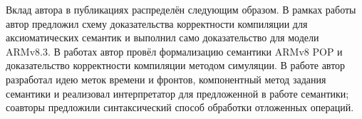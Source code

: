 {\begin{refsection}
        Вклад автора в публикациях распределён следующим образом.
        В рамках работы \cite{Podkopaev-al:NTV17,Podkopaev-al:ISPRAS17} автор предложил схему доказательства корректности компиляции
        для аксиоматических семантик и выполнил само доказательство для модели ARMv8.3.
        В работах \cite{Podkopaev-al:ECOOP17, Podkopaev-al:PLC17}
        автор провёл формализацию семантики ARMv8 POP и доказательство корректности компиляции методом симуляции.
        В работе \cite{Podkopaev-al:CoRR16} автор разработал идею меток времени и фронтов, компонентный метод задания
        семантики и реализовал интерпретатор для предложенной в работе семантики; соавторы предложили синтаксический способ
        обработки отложенных операций.
    \end{refsection}
    \begin{refsection}[vak,papers,conf]%
        \printbibliography[heading=countauthorvak, env=countauthorvak, keyword=biblioauthorvak, section=2]%
        \printbibliography[heading=countauthornotvak, env=countauthornotvak, keyword=biblioauthornotvak, section=2]%
        \printbibliography[heading=countauthorconf, env=countauthorconf, keyword=biblioauthorconf, section=2]%
        \printbibliography[heading=countauthor, env=countauthor, keyword=biblioauthor, section=2]%
        \nocite{Podkopaev-al:NTV17}%
        \nocite{Podkopaev-al:ISPRAS17}%
        \nocite{Podkopaev-al:ECOOP17}%
        \nocite{Podkopaev-al:PLC17,Podkopaev-al:CoRR16}%
    \end{refsection}
}
